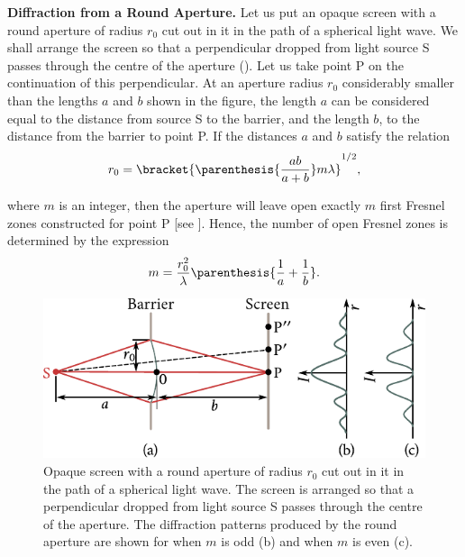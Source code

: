 \textbf{Diffraction from a Round Aperture.}
Let us put an opaque screen with a round aperture of radius $r_0$ cut out in it in the path of a spherical light wave.
We shall arrange the screen so that a perpendicular dropped from light source S passes through the centre of the aperture ().
Let us take point P on the continuation of this perpendicular.
At an aperture radius $r_0$ considerably smaller than the lengths $a$ and $b$ shown in the figure, the length $a$ can be considered equal to the distance from source S to the barrier, and the length $b$, to the distance from the barrier to point P.
If the distances $a$ and $b$ satisfy the relation
\begin{equation}\label{eq:18_12}
	r_0 = \bracket{ \parenthesis{ \frac{ab}{a+b} } m \lambda }^{1/2},
\end{equation}

\noindent
where $m$ is an integer, then the aperture will leave open exactly $m$ first Fresnel zones constructed for point P [see ].
Hence, the number of open Fresnel zones is determined by the expression
\begin{equation}\label{eq:18_13}
	m = \frac{r_0^2}{\lambda} \parenthesis{\frac{1}{a} + \frac{1}{b}}.
\end{equation}

\begin{figure}[!htb]
	\begin{center}
		\includegraphics[scale=1]{figures/ch_18/fig_18_10.pdf}
        \caption[]{Opaque screen with a round aperture of radius $r_0$ cut out in it in the path of a spherical light wave. The screen is arranged so that a perpendicular dropped from light source S passes through the centre of the aperture. The diffraction patterns produced by the round aperture are shown for when $m$ is odd (b) and when $m$ is even (c).}
		\label{fig:18_10}
	\end{center}
	\vspace{-0.8cm}
\end{figure}

